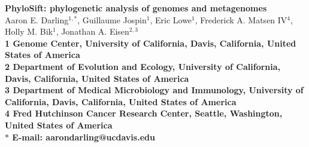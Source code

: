 \documentclass[10pt]{article}
\date{}
\begin{document}
\begin{flushleft}
{\Large
\textbf{PhyloSift: phylogenetic analysis of genomes and metagenomes}
}
\\
Aaron E. Darling$^{1,\ast}$,
Guillaume Jospin$^{1}$,
Eric Lowe$^{1}$,
Frederick A. Matsen IV$^{4}$,
Holly M. Bik$^{1}$,
Jonathan A. Eisen$^{2,3}$
\\
\bf{1} Genome Center, University of California, Davis, California, United States of America
\\
\bf{2} Department of Evolution and Ecology, University of California, Davis, California, United States of America
\\
\bf{3} Department of Medical Microbiology and Immunology, University of California, Davis, California, United States of America
\\
\bf{4} Fred Hutchinson Cancer Research Center, Seattle, Washington, United States of America
\\
$\ast$ E-mail: aarondarling@ucdavis.edu
\end{flushleft}



\end{document}
